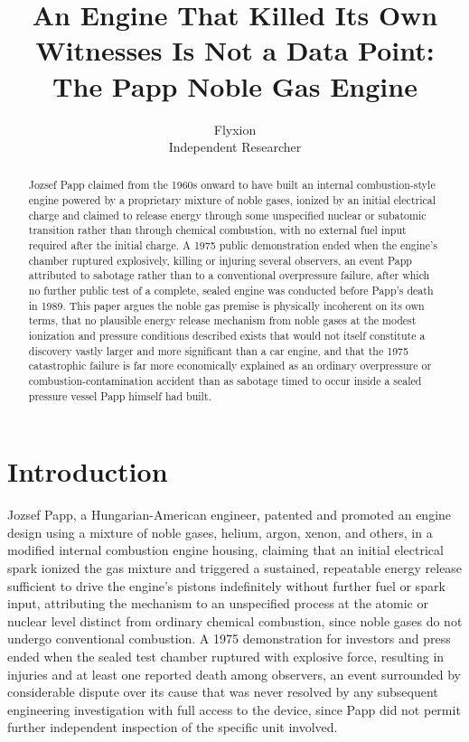 \documentclass[11pt]{article}
\title{An Engine That Killed Its Own Witnesses Is Not a Data Point: The Papp Noble Gas Engine}
\author{Flyxion \\ \small Independent Researcher}
\date{}
\begin{document}
\maketitle

\begin{abstract}
Jozsef Papp claimed from the 1960s onward to have built an internal combustion-style engine powered by a proprietary mixture of noble gases, ionized by an initial electrical charge and claimed to release energy through some unspecified nuclear or subatomic transition rather than through chemical combustion, with no external fuel input required after the initial charge. A 1975 public demonstration ended when the engine's chamber ruptured explosively, killing or injuring several observers, an event Papp attributed to sabotage rather than to a conventional overpressure failure, after which no further public test of a complete, sealed engine was conducted before Papp's death in 1989. This paper argues the noble gas premise is physically incoherent on its own terms, that no plausible energy release mechanism from noble gases at the modest ionization and pressure conditions described exists that would not itself constitute a discovery vastly larger and more significant than a car engine, and that the 1975 catastrophic failure is far more economically explained as an ordinary overpressure or combustion-contamination accident than as sabotage timed to occur inside a sealed pressure vessel Papp himself had built.
\end{abstract}

\section{Introduction}

Jozsef Papp, a Hungarian-American engineer, patented and promoted an engine design using a mixture of noble gases, helium, argon, xenon, and others, in a modified internal combustion engine housing, claiming that an initial electrical spark ionized the gas mixture and triggered a sustained, repeatable energy release sufficient to drive the engine's pistons indefinitely without further fuel or spark input, attributing the mechanism to an unspecified process at the atomic or nuclear level distinct from ordinary chemical combustion, since noble gases do not undergo conventional combustion. A 1975 demonstration for investors and press ended when the sealed test chamber ruptured with explosive force, resulting in injuries and at least one reported death among observers, an event surrounded by considerable dispute over its cause that was never resolved by any subsequent engineering investigation with full access to the device, since Papp did not permit further independent inspection of the specific unit involved.
\end{document}
